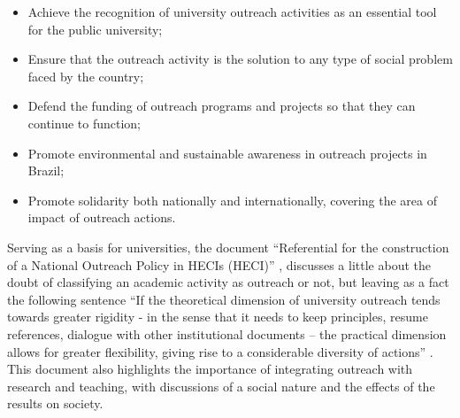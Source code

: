 \begin{itemize}
    \item Achieve the recognition of university outreach activities as an essential tool for the public university;
    \item Ensure that the outreach activity is the solution to any type of social problem faced by the country;
    \item Defend the funding of outreach programs and projects so that they can continue to function;
    \item Promote environmental and sustainable awareness in outreach projects in Brazil;
    \item Promote solidarity both nationally and internationally, covering the area of impact of outreach actions.
\end{itemize}


Serving as a basis for universities, the document ``Referential for the construction of a National Outreach Policy in \aclp{HECI} (\ac{HECI})'' \cite{referenciaisPolitica},
discusses a little about the doubt of classifying an academic activity as outreach or not, but leaving as a fact the following sentence ``If the theoretical dimension of university outreach tends towards greater rigidity - in the sense that it needs to keep principles, resume references,
dialogue with other institutional documents – the practical dimension allows for greater flexibility, giving rise to a considerable diversity of actions'' \cite[p.43]{referenciaisPolitica}.
This document also highlights the importance of integrating outreach with research and teaching, with discussions of a social nature and the effects of the results on society.

